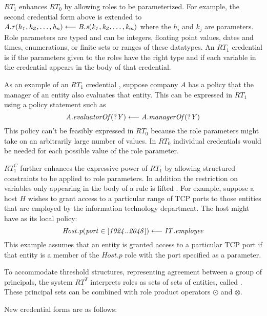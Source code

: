$RT_1$ enhances $RT_0$ by allowing roles to be parameterized. For example, the second
credential form above is extended to $\mathit{A.r(h_1, h_2, \ldots, h_n)} \stackrel{}{\longleftarrow} \mathit{B.s(k_1, k_2, \ldots,
  k_m)}$ where the $h_i$ and $k_j$ are parameters. Role parameters are typed and can be
integers, floating point values, dates and times, enumerations, or finite sets or ranges of
these datatypes. An $RT_1$ credential is  if the parameters given to the
roles have the right type and if each variable in the credential appears in the body of that
credential.

As an example of an $RT_1$ credential \cite{Li:DRBTMF}, suppose company $A$ has a policy that
the manager of an entity also evaluates that entity. This can be expressed in $RT_1$ using a
policy statement such as
\begin{displaymath}
\mathit{A.\mathit{evaluatorOf}(?Y)} \stackrel{}{\longleftarrow} \mathit{A.\mathit{managerOf(?Y)}}
\end{displaymath}
This policy can't be feasibly expressed in $RT_0$ because the role parameters might take on an
arbitrarily large number of values. In $RT_0$ individual credentials would be needed for each
possible value of the role parameter.

$RT_1^C$ further enhances the expressive power of $RT_1$ by allowing structured constraints to
be applied to role parameters. In addition the restriction on variables only appearing in the
body of a rule is lifted \cite{Li:DCFTML,Li:RRBTMF}. For example, suppose a host $H$ wishes to
grant access to a particular range of TCP ports to those entities that are employed by the
information technology department. The host might have as its local policy:
\begin{displaymath}
\mathit{\mathit{Host}.p(\mathit{port} \in
  [1024..2048])} \stackrel{}{\longleftarrow} \mathit{\mathit{IT}.\mathit{employee}}
\end{displaymath}
This example assumes that an entity is granted access to a particular TCP port if that entity is
a member of the $\mathit{Host}.p$ role with the port specified as a parameter.

To accommodate threshold structures, representing agreement between a group of principals, the
system $RT^T$ interprets roles as sets of sets of entities, called .
These principal sets can be combined with role product operators $\odot$ and $\otimes$.

New credential forms are as follows:

